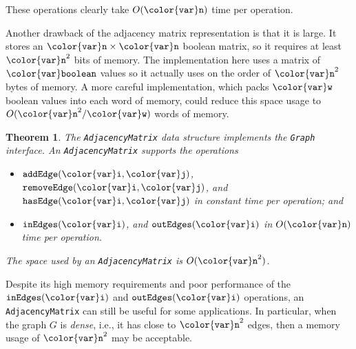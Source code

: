 \documentclass[10pt]{book}
\newcommand{\cpponly}[1]{}\newcommand{\javaonly}[1]{#1}\newcommand{\pcodeonly}[1]{}\newcommand{\notpcode}[1]{#1}\newcommand{\lang}{Java}
\theoremstyle{plain}
\newtheorem{thm}{Theorem}[chapter]
\theoremstyle{definition}
\begin{document}
These operations clearly take $O(\ensuremath{\mathtt{{\color{var}n}}})$ time per operation.  

Another drawback of the adjacency matrix representation is that it
is large.  It stores an $\ensuremath{\mathtt{{\color{var}n}}}\times \ensuremath{\mathtt{{\color{var}n}}}$ boolean matrix, so it requires at
least $\ensuremath{\mathtt{{\color{var}n}}}^2$ bits of memory.  The implementation here uses a matrix
of \javaonly{\ensuremath{\mathtt{{\color{var}boolean}}}}\cpponly{\ensuremath{\mathtt{{\color{var}bool}}}} values so it actually uses on the
order of $\ensuremath{\mathtt{{\color{var}n}}}^2$ bytes of memory.  A more careful implementation, which
packs \ensuremath{\mathtt{{\color{var}w}}} boolean values into each word of memory, could reduce this
space usage to $O(\ensuremath{\mathtt{{\color{var}n}}}^2/\ensuremath{\mathtt{{\color{var}w}}})$ words of memory.

\begin{thm}
The \texttt{AdjacencyMatrix} data structure implements the \texttt{Graph} interface.
An \texttt{AdjacencyMatrix} supports the operations
\begin{itemize}
  \item \ensuremath{\mathtt{addEdge({\color{var}i},{\color{var}j})}}, \ensuremath{\mathtt{removeEdge({\color{var}i},{\color{var}j})}}, and \ensuremath{\mathtt{hasEdge({\color{var}i},{\color{var}j})}} in constant
  time per operation; and
  \item \ensuremath{\mathtt{inEdges({\color{var}i})}}, and \ensuremath{\mathtt{outEdges({\color{var}i})}} in $O(\ensuremath{\mathtt{{\color{var}n}}})$ time per operation.
\end{itemize}
The space used by an \texttt{AdjacencyMatrix} is  $O(\ensuremath{\mathtt{{\color{var}n}}}^2)$.
\end{thm}

Despite its high memory requirements and poor performance of the \ensuremath{\mathtt{inEdges({\color{var}i})}}
and \ensuremath{\mathtt{outEdges({\color{var}i})}} operations, an \texttt{AdjacencyMatrix} can still be useful for
some applications.  In particular, when the graph $G$ is \emph{dense},
i.e., it has close to $\ensuremath{\mathtt{{\color{var}n}}}^2$ edges, then a memory usage of $\ensuremath{\mathtt{{\color{var}n}}}^2$
may be acceptable.
\end{document}
